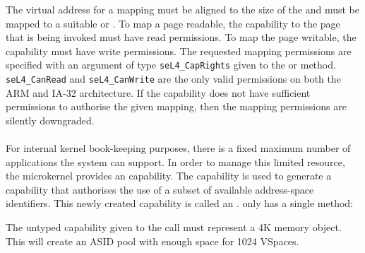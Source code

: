 \vspace{2ex}

The virtual address for a  mapping
must be aligned to
the size of the  and must be mapped to a suitable 
or . To map a page readable, the capability
to the page
that is being invoked must have read permissions. To map the page
writable, the capability must have write permissions. The requested
mapping permissions are specified with an argument of type
\texttt{seL4\_CapRights} given to the  \ifxeightsix or  \fi method.
\texttt{seL4\_CanRead} and \texttt{seL4\_CanWrite} are the only valid
permissions on \ifxeightsix both \else the \fi ARM \ifxeightsix and IA-32 \fi architecture\fi. If the capability does not have
sufficient permissions to authorise the given mapping, then
the mapping permissions are silently downgraded.

\paragraph{}

For internal kernel book-keeping purposes, there is a fixed maximum
number of applications the system can support.  In order to manage
this limited resource, the microkernel provides an 
capability. The  capability is used to generate a
capability that authorises the use of a subset of available address-space identifiers.
This newly created capability is called an
.  only has a single method:
\vspace{2ex}\\
\vspace{2ex}

The untyped
capability given to the  call must represent a 4K memory object.
This will create an ASID pool with enough space for 1024 VSpaces.

